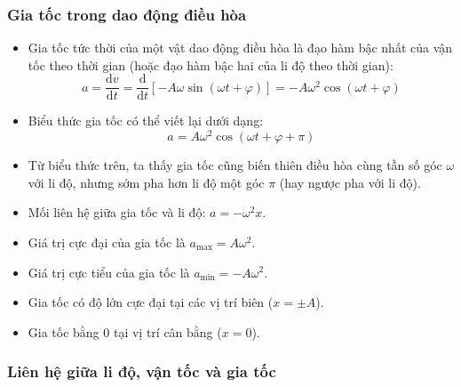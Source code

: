 \subsubsection{Gia tốc trong dao động điều hòa}

\begin{hoatdong}
\end{hoatdong}

\begin{kienthuc}
\begin{itemize}
    \item Gia tốc tức thời của một vật dao động điều hòa là đạo hàm bậc nhất của vận tốc theo thời gian (hoặc đạo hàm bậc hai của li độ theo thời gian):
    $$a = \dfrac{\mathrm{d}v}{\mathrm{d}t} = \dfrac{\mathrm{d}}{\mathrm{d}t}[-A\omega\sin(\omega t + \varphi)] = -A\omega^2\cos(\omega t + \varphi)$$
    \item Biểu thức gia tốc có thể viết lại dưới dạng:
    $$a = A\omega^2\cos\left(\omega t + \varphi + \pi\right)$$
    \item Từ biểu thức trên, ta thấy gia tốc cũng biến thiên điều hòa cùng tần số góc $\omega$ với li độ, nhưng sớm pha hơn li độ một góc $\pi$ (hay ngược pha với li độ).
    \item Mối liên hệ giữa gia tốc và li độ: $a = -\omega^2 x$.
    \item Giá trị cực đại của gia tốc là $a_{\text{max}} = A\omega^2$.
    \item Giá trị cực tiểu của gia tốc là $a_{\text{min}} = -A\omega^2$.
    \item Gia tốc có độ lớn cực đại tại các vị trí biên ($x = \pm A$).
    \item Gia tốc bằng 0 tại vị trí cân bằng ($x = 0$).
\end{itemize}
\end{kienthuc}

\subsubsection{Liên hệ giữa li độ, vận tốc và gia tốc}

